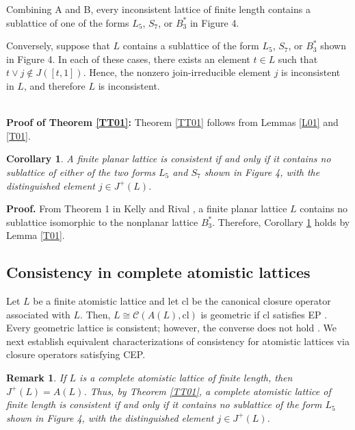 \documentclass[12pt]{article}
\newtheorem{remark}{\bf Remark}[section]
\newtheorem{corollary}{\bf Corollary}[section]
\def\QEDopen{{\setlength{\fboxsep}{0pt}\setlength{\fboxrule}{0.2pt}\fbox{\rule[0pt]{0pt}{1.3ex}\rule[0pt]{1.3ex}{0pt}}}}
\def\QED{\QEDopen}
\def\proof{{\bf Proof.} }
\def\endproof{\hspace*{\fill}~\QED\par\endtrivlist\unskip}
\begin{document}
Combining A and B, every inconsistent lattice of finite length contains a sublattice of one of the forms $L_5$, $S_7$, or $B_{3}^{*}$ in Figure 4.

Conversely, suppose that $L$ contains a sublattice of the form $L_5$, $S_7$, or $B_{3}^{*}$ shown in Figure 4. 
In each of these cases, there exists an element $t\in L$ such that $t\vee j\notin J([t,1])$. Hence, the nonzero join-irreducible element $j$ is inconsistent in $L$, 
and therefore $L$ is inconsistent.
\endproof
\quad\\
\textbf{Proof of Theorem \ref{TT01}:} Theorem \ref{TT01} follows from Lemmas \ref{L01} and \ref{T01}.\endproof 
\begin{corollary}\label{C02}
A finite planar lattice is consistent if and only if it contains no sublattice of either of the two forms $L_5$ and $S_7$ shown in Figure 4, with the distinguished element $j\in J^{+}(L)$.
\end{corollary}
\proof
From Theorem 1 in Kelly and Rival \cite{Kelly}, a finite planar lattice $L$ contains no sublattice isomorphic to the nonplanar lattice $B_{3}^{*}$. Therefore, Corollary \ref{C02} holds by Lemma \ref{T01}.
\endproof 


\subsection{Consistency in complete atomistic lattices}
Let $L$ be a finite atomistic lattice and let $\mbox{cl}$ be the canonical closure operator associated with $L$. 
Then, $L\cong \mathcal{C}(A(L), \mbox{cl})$ is geometric 
if $\mbox{cl}$ satisfies EP \cite{Crawley73, Birkhoff73}. 
Every geometric lattice is consistent; however, the converse does not hold \cite{Stern99}.
We next establish equivalent characterizations of consistency for atomistic lattices 
via closure operators satisfying CEP.


\begin{remark}\label{r00}
\emph{If $L$ is a complete atomistic lattice of finite length, then $J^{+}(L)=A(L)$. Thus, by Theorem \ref{TT01}, a complete atomistic lattice of finite length is consistent if and only if it contains no sublattice of the form $L_{5}$ shown in Figure 4, with the distinguished element $j\in J^{+}(L)$.}    
\end{remark}
\end{document}
